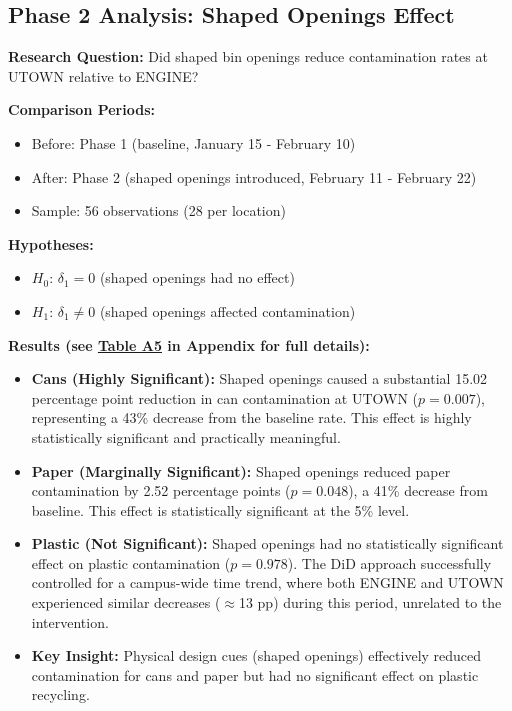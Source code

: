 \documentclass[12pt]{article}
\begin{document}
\subsection{Phase 2 Analysis: Shaped Openings Effect}

\textbf{Research Question:} Did shaped bin openings reduce contamination rates at UTOWN relative to ENGINE?

\textbf{Comparison Periods:}
\begin{itemize}
    \item Before: Phase 1 (baseline, January 15 - February 10)
    \item After: Phase 2 (shaped openings introduced, February 11 - February 22)
    \item Sample: 56 observations (28 per location)
\end{itemize}

\textbf{Hypotheses:}
\begin{itemize}
    \item $H_0$: $\delta_1 = 0$ (shaped openings had no effect)
    \item $H_1$: $\delta_1 \neq 0$ (shaped openings affected contamination)
\end{itemize}

\textbf{Results (see \hyperref[tab:phase2]{Table A5} in Appendix for full details):}

\begin{itemize}
    \item \textbf{Cans (Highly Significant):} Shaped openings caused a substantial 15.02 percentage point reduction in can contamination at UTOWN ($p = 0.007$), representing a 43\% decrease from the baseline rate. This effect is highly statistically significant and practically meaningful.

    \item \textbf{Paper (Marginally Significant):} Shaped openings reduced paper contamination by 2.52 percentage points ($p = 0.048$), a 41\% decrease from baseline. This effect is statistically significant at the 5\% level.

    \item \textbf{Plastic (Not Significant):} Shaped openings had no statistically significant effect on plastic contamination ($p = 0.978$). The DiD approach successfully controlled for a campus-wide time trend, where both ENGINE and UTOWN experienced similar decreases ($\approx$13 pp) during this period, unrelated to the intervention.

    \item \textbf{Key Insight:} Physical design cues (shaped openings) effectively reduced contamination for cans and paper but had no significant effect on plastic recycling.
\end{itemize}
\end{document}
